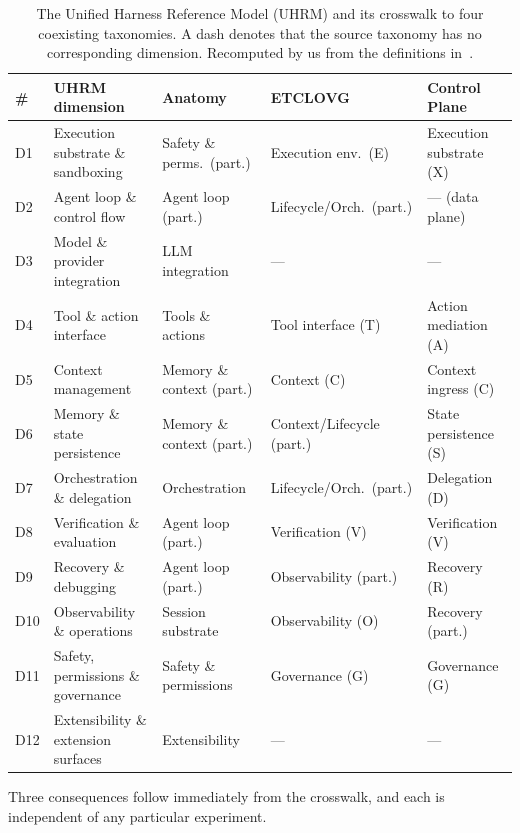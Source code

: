 \documentclass[conference]{IEEEtran}
\begin{document}
\begin{table}[t]
\caption{The Unified Harness Reference Model (UHRM) and its crosswalk to four coexisting taxonomies. A dash denotes that the source taxonomy has no corresponding dimension. Recomputed by us from the definitions in~\cite{b1,b2,b7}.}
\label{tab:crosswalk}
\centering
\footnotesize
\begin{tabular}{@{}lllll@{}}
\toprule
\textbf{\#} & \textbf{UHRM dimension} & \textbf{Anatomy}~\cite{b1} & \textbf{ETCLOVG}~\cite{b2} & \textbf{Control Plane}~\cite{b7} \\
\midrule
D1  & Execution substrate \& sandboxing      & Safety \& perms.\ (part.) & Execution env.\ (E) & Execution substrate (X) \\
D2  & Agent loop \& control flow             & Agent loop (part.)        & Lifecycle/Orch.\ (part.) & --- (data plane) \\
D3  & Model \& provider integration          & LLM integration           & --- & --- \\
D4  & Tool \& action interface               & Tools \& actions          & Tool interface (T) & Action mediation (A) \\
D5  & Context management                     & Memory \& context (part.) & Context (C) & Context ingress (C) \\
D6  & Memory \& state persistence            & Memory \& context (part.) & Context/Lifecycle (part.) & State persistence (S) \\
D7  & Orchestration \& delegation            & Orchestration             & Lifecycle/Orch.\ (part.) & Delegation (D) \\
D8  & Verification \& evaluation             & Agent loop (part.)        & Verification (V) & Verification (V) \\
D9  & Recovery \& debugging                  & Agent loop (part.)        & Observability (part.) & Recovery (R) \\
D10 & Observability \& operations            & Session substrate         & Observability (O) & Recovery (part.) \\
D11 & Safety, permissions \& governance      & Safety \& permissions     & Governance (G) & Governance (G) \\
D12 & Extensibility \& extension surfaces    & Extensibility             & --- & --- \\
\bottomrule
\end{tabular}
\end{table}

Three consequences follow immediately from the crosswalk, and each is independent of any particular experiment.
\end{document}
